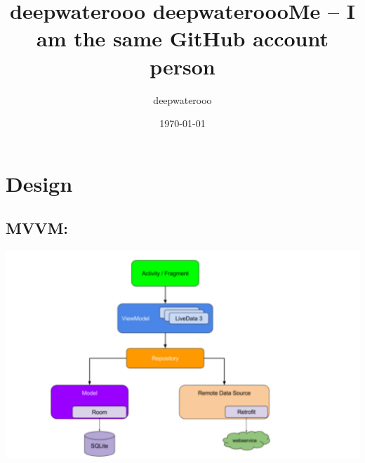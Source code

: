 \documentclass[9pt, b5paper]{article}
\author{deepwaterooo}
\date{\today}
\title{deepwaterooo deepwateroooMe -- I am the same GitHub account person}
\begin{document}
\maketitle
\tableofcontents


\section{Design}
\label{sec-1}
\subsection{MVVM:}
\label{sec-1-1}

\includegraphics[width=.9\linewidth]{./pic/readme_20220919_110722.png}
\end{document}
